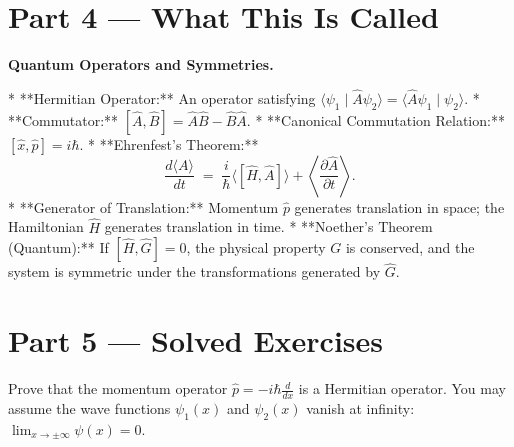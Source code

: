 \documentclass[12pt, a4paper, twoside]{book}
\begin{document}
\newpage

\section{Part 4 --- What This Is Called}

\begin{namebox}
\textbf{Quantum Operators and Symmetries.}

* **Hermitian Operator:** An operator satisfying $\langle \psi_1 \mid \hat{A} \psi_2 \rangle = \langle \hat{A} \psi_1 \mid \psi_2 \rangle$.
* **Commutator:** $[\hat{A}, \hat{B}] = \hat{A}\hat{B} - \hat{B}\hat{A}$.
* **Canonical Commutation Relation:** $[\hat{x}, \hat{p}] = i\hbar$.
* **Ehrenfest's Theorem:**
  \[
    \frac{d\langle A \rangle}{dt} \;=\; \frac{i}{\hbar} \langle [\hat{H}, \hat{A}] \rangle + \left\langle \frac{\partial \hat{A}}{\partial t} \right\rangle.
  \]
* **Generator of Translation:** Momentum $\hat{p}$ generates translation in space; the Hamiltonian $\hat{H}$ generates translation in time.
* **Noether's Theorem (Quantum):** If $[\hat{H}, \hat{G}] = 0$, the physical property $G$ is conserved, and the system is symmetric under the transformations generated by $\hat{G}$.
\end{namebox}

\newpage

\section{Part 5 --- Solved Exercises}

\begin{exercise}
Prove that the momentum operator $\hat{p} = -i\hbar \frac{d}{dx}$ is a Hermitian operator. You may assume the wave functions $\psi_1(x)$ and $\psi_2(x)$ vanish at infinity: $\lim_{x\to\pm\infty} \psi(x) = 0$.
\end{exercise}
\end{document}
